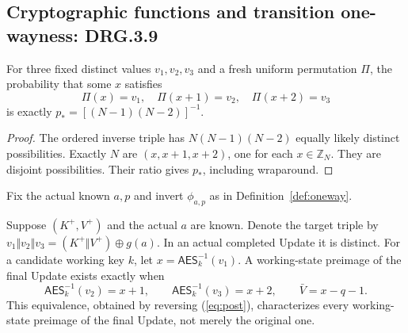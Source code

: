 \documentclass[journal=tosc,preprint,floatrow,nohyperxmp]{iacrtrans}
\newif\ifjordireview
\newcounter{jordinote}
\newcommand{\jordinote}[2]{%
  \ifjordireview
  \stepcounter{jordinote}\par\medskip\noindent
  \fcolorbox{blue!55!black}{blue!4}{%
    \begin{minipage}{\dimexpr\linewidth-2\fboxsep-2\fboxrule\relax}
    \small\raggedright\color{blue!45!black}
    \textbf{Solo Jordi -- J\thejordinote: #1}\par\smallskip
    #2
    \end{minipage}}\par\medskip
  \fi
}
\numberwithin{lemma}{section}
\numberwithin{proposition}{section}
\newcommand{\Enc}{\mathsf{AES}}
\numberwithin{equation}{section}
\theoremstyle{definition}
\numberwithin{definition}{section}
\theoremstyle{plain}
\begin{document}
\jordinote{Qué añadimos al argumento del XOR}{Nos inspiramos en la observación del BSI: una máscara pública no debilita una distribución uniforme por el mero XOR. Pero aquí además hay dos Update con la misma máscara y claves derivadas. Revisa que las leyes sean uniformes en la máscara elegida y que el acoplamiento cubra ambos grupos, incluso con elecciones adaptativas; el razonamiento local del XOR no basta para eso.}

\subsection{Cryptographic functions and transition one-wayness: DRG.3.9}
\begin{lemma}\label{lem:inverse}
For three fixed distinct values $v_1,v_2,v_3$ and a fresh uniform permutation $\Pi$, the probability that some $x$ satisfies
\[
 \Pi(x)=v_1,\quad \Pi(x+1)=v_2,\quad \Pi(x+2)=v_3
\]
is exactly $p_*=[(N-1)(N-2)]^{-1}$.
\end{lemma}
\begin{proof}
The ordered inverse triple has $N(N-1)(N-2)$ equally likely distinct possibilities. Exactly $N$ are $(x,x+1,x+2)$, one for each $x\in\mathbb Z_N$. They are disjoint possibilities. Their ratio gives $p_*$, including wraparound.
\end{proof}
Fix the actual known $a,p$ and invert $\phi_{a,p}$ as in Definition~\ref{def:oneway}.

Suppose $(K^+,V^+)$ and the actual $a$ are known. Denote the target triple by $v_1\Vert v_2\Vert v_3=(K^+\Vert V^+)\oplus g(a)$. In an actual completed Update it is distinct. For a candidate working key $k$, let $x=\Enc_k^{-1}(v_1)$. A working-state preimage of the final Update exists exactly when
\begin{equation}
 \Enc_k^{-1}(v_2)=x+1,\qquad \Enc_k^{-1}(v_3)=x+2,\qquad
 \bar V=x-q-1.\label{eq:alignment}
\end{equation}
This equivalence, obtained by reversing (\ref{eq:post}), characterizes every working-state preimage of the final Update, not merely the original one.

\jordinote{Cualquier preimagen y la clave verdadera}{No buscamos solo la clave original: AIS pide dificultad para encontrar cualquier predecesor compatible con la entrada real. La alineación inversa caracteriza los estados de trabajo que son preimágenes del Update final. Con entrada no vacía, un estado anterior completo debe además pasar por el pre-Update; esa verificación aparece después. Revisa los índices $x,x+1,x+2$ y $\bar V=x-q-1$. La terna real proviene de alguna clave; el conteo para una etiqueta independiente no puede aplicarse sin la reducción y el control de dependencia que siguen.}
\end{document}
